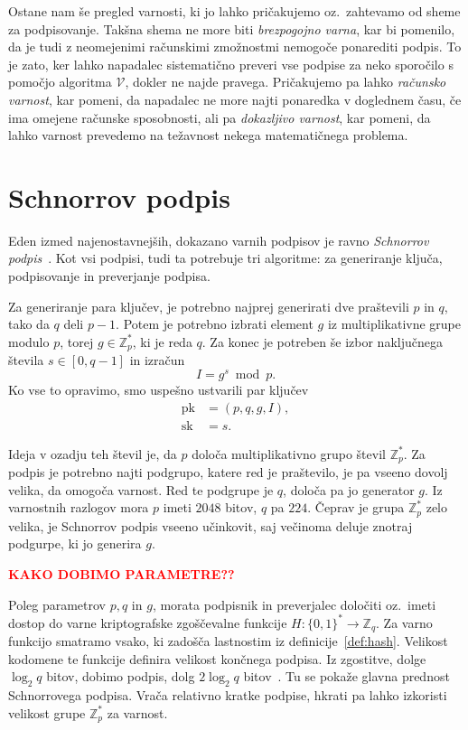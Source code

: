 \documentclass[isrm2, tisk]{fmfdelo}
\newcommand{\Z}{\mathbb Z}
\newcommand{\todo}[1]{\textcolor{red}{\textbf{\uppercase{#1}??}}}
\begin{document}
Ostane nam še pregled varnosti, ki jo lahko pričakujemo oz.\ zahtevamo od sheme za podpisovanje. 
Takšna shema ne more biti \textit{brezpogojno varna}, kar bi pomenilo, da je tudi z neomejenimi 
računskimi zmožnostmi nemogoče ponarediti podpis. To je zato, ker lahko napadalec sistematično 
preveri vse podpise za neko sporočilo s pomočjo algoritma $\mathcal{V}$, dokler ne najde pravega. Pričakujemo 
pa lahko \textit{računsko varnost}, kar pomeni, da napadalec ne more najti ponaredka v doglednem času,
če ima omejene računske sposobnosti, ali pa \textit{dokazljivo varnost}, kar pomeni, da lahko 
varnost prevedemo na težavnost nekega matematičnega problema.

\section{Schnorrov podpis}
\label{sec:schnorr}
Eden izmed najenostavnejših, dokazano varnih podpisov je ravno \textit{Schnorrov podpis}~\cite{schnorr1989sig}.
Kot vsi podpisi, tudi ta potrebuje tri algoritme: za generiranje ključa, podpisovanje in preverjanje 
podpisa. 

Za generiranje para ključev, je potrebno najprej generirati dve praštevili $p$ in $q$, tako da $q$ 
deli $p-1$. Potem je potrebno izbrati element $g$ iz multiplikativne grupe modulo $p$, torej 
$g \in \Z_p^*$, ki je reda $q$. Za konec je potreben še izbor naključnega števila $s \in [0, q - 1]$
in izračun 
$$ 
I = g^s \bmod p.
$$
Ko vse to opravimo, smo uspešno ustvarili par ključev
\begin{align*}
\text{pk} &= (p, q, g, I), \\
\text{sk} &= s.
\end{align*}

Ideja v ozadju teh števil je, da $p$ določa multiplikativno grupo števil $\Z_p^*$. Za podpis je 
potrebno najti podgrupo, katere red je praštevilo, je pa vseeno dovolj velika, da omogoča varnost. 
Red te podgrupe je $q$, določa pa jo generator $g$. Iz varnostnih razlogov mora $p$ imeti $2048$ 
bitov, $q$ pa $224$. Čeprav je grupa $\Z_p^*$ zelo velika, je Schnorrov podpis vseeno učinkovit, 
saj večinoma deluje znotraj podgurpe, ki jo generira $g$.

\todo{kako dobimo parametre}

Poleg parametrov $p, q$ in $g$, morata podpisnik in preverjalec določiti oz.\ imeti dostop do varne 
kriptografske zgoščevalne funkcije $H : \{0, 1\}^* \rightarrow \Z_q$. Za varno funkcijo smatramo vsako, 
ki zadošča lastnostim iz definicije~\ref{def:hash}. Velikost kodomene te funkcije definira velikost 
končnega podpisa. Iz zgostitve, dolge $\log_2 q$ bitov, dobimo podpis, dolg $2 \log_2 q$ bitov~\cite{
stinson2023crypto}. Tu se pokaže glavna prednost Schnorrovega podpisa. Vrača relativno kratke podpise, 
hkrati pa lahko izkoristi velikost grupe $\Z_p^*$ za varnost.
\end{document}
